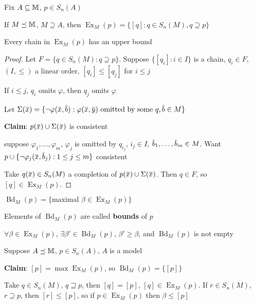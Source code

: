 \documentclass[11pt]{article}
\DeclareMathOperator{\Ex}{Ex}
\DeclareMathOperator{\Bd}{Bd}
\begin{document}
Fix \(A\subseteq\mathbb{M}\), \(p\in S_n(A)\)

\begin{definition}[]
If \(M\preceq\mathbb{M}\), \(M\supseteq A\), then \(\Ex_M(p)=\{[q]:q\in S_n(M), q\supseteq p\}\)
\end{definition}

\begin{lemma}[]
Every chain in \(\Ex_M(p)\) has an upper bound
\end{lemma}

\begin{proof}
Let \(F=\{q\in S_n(M):q\supseteq p\}\). Suppose \(\{[q_i]:i\in I\}\) is a chain, \(q_i\in F\), \((I,\le)\) a linear
order, \([q_i]\le[q_j]\) for \(i\le j\)

If \(i\le j\), \(q_i\) omits \(\varphi\), then \(q_j\) omits \(\varphi\)

Let \(\Sigma(\barx)=\{\neg\varphi(\barx,\barb):\varphi(\barx,\bary)\text{ omitted by some }q, \barb\in M\}\)

\textbf{Claim}: \(p(\barx)\cup\Sigma(\barx)\) is consistent

suppose \(\varphi_1,\dots,\varphi_m\), \(\varphi_j\) is omitted by \(q_{i_j}\), \(i_j\in I\), \(\barb_1,\dots,\barb_m\in M\).
Want \(p\cup\{\neg\varphi_j(\barx,\barb_j):1\le j\le m\}\) consistent

Take \(q(\barx)\in S_n(M)\) a completion of \(p(\barx)\cup\Sigma(\barx)\). Then \(q\in F\),
so \([q]\in\Ex_M(p)\).
\end{proof}

\begin{definition}[]
\(\Bd_M(p)=\{\text{maximal }\beta\in\Ex_M(p)\}\)

Elements of \(\Bd_M(p)\) are called \textbf{bounds} of \(p\)
\end{definition}

\begin{corollary}[]
\label{3.31.13}
\(\forall\beta\in\Ex_M(p)\), \(\exists\beta'\in\Bd_M(p)\), \(\beta'\ge\beta\), and \(\Bd_M(p)\) is not empty
\end{corollary}

\begin{examplle}[]
Suppose \(A\preceq\mathbb{M}\), \(p\in S_n(A)\), \(A\) is a model

\textbf{Claim}: \([p]=\max\Ex_M(p)\), so \(\Bd_M(p)=\{[p]\}\)

Take \(q\in S_n(M)\), \(q\sqsupseteq p\), then \([q]=[p]\), \([q]\in\Ex_M(p)\).
If \(r\in S_n(M)\), \(r\supseteq p\), then \([r]\le[p]\), so if \(p\in\Ex_M(p)\) then \(\beta\le[p]\)
\end{examplle}
\end{document}
